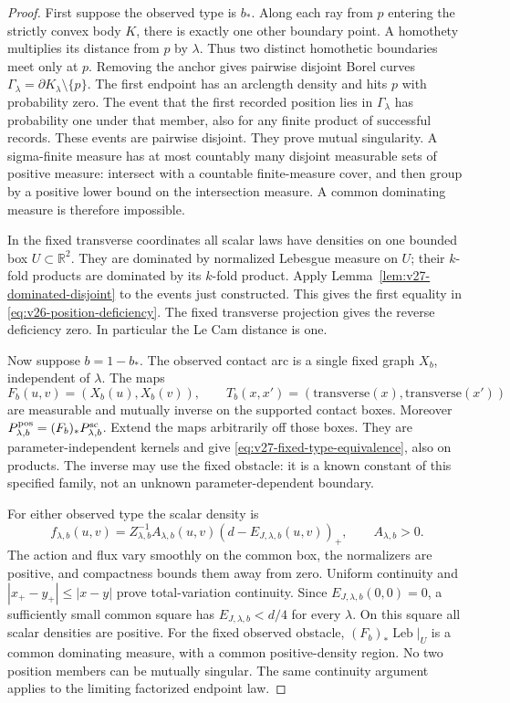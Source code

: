 \begin{proof}
First suppose the observed type is \(b_*\).  Along each ray from \(p\)
entering the strictly convex body \(K\), there is exactly one other boundary
point.  A homothety multiplies its distance from \(p\) by \(\lambda\).
Thus two distinct homothetic boundaries meet only at \(p\).  Removing the
anchor gives pairwise disjoint Borel curves
\(\Gamma_\lambda=\partial K_\lambda\setminus\{p\}\).
The first endpoint has an arclength density and hits \(p\) with probability
zero.  The event that the first recorded position lies in
\(\Gamma_\lambda\) has probability one under that member, also for any
finite product of successful records.  These events are pairwise disjoint.
They prove mutual singularity.  A sigma-finite measure has at most
countably many disjoint measurable sets of positive measure: intersect
with a countable finite-measure cover, and then group by a positive lower
bound on the intersection measure.  A common dominating measure is
therefore impossible.

In the fixed transverse coordinates all scalar laws have densities on one
bounded box \(U\subset\mathbb R^2\).  They are dominated by normalized
Lebesgue measure on \(U\); their \(k\)-fold products are dominated by its
\(k\)-fold product.  Apply Lemma~\ref{lem:v27-dominated-disjoint} to the
events just constructed.  This gives the first equality in
\eqref{eq:v26-position-deficiency}.  The fixed transverse projection gives
the reverse deficiency zero.  In particular the Le Cam distance is one.

Now suppose \(b=1-b_*\).  The observed contact arc is a single fixed graph
\(X_b\), independent of \(\lambda\).  The maps
\[
 F_b(u,v)=(X_b(u),X_b(v)),\qquad
 T_b(x,x')=(\text{transverse}(x),\text{transverse}(x'))
\]
are measurable and mutually inverse on the supported contact boxes.
Moreover \(P_{\lambda,b}^{\rm pos}=(F_b)_*P_{\lambda,b}^{\rm sc}\).
Extend the maps arbitrarily off those boxes.  They are
parameter-independent kernels and give
\eqref{eq:v27-fixed-type-equivalence}, also on products.  The inverse may
use the fixed obstacle: it is a known constant of this specified family,
not an unknown parameter-dependent boundary.

For either observed type the scalar density is
\begin{equation}\label{eq:v27-scalar-finite-density}
 f_{\lambda,b}(u,v)=Z_{\lambda,b}^{-1}A_{\lambda,b}(u,v)
                  (d-E_{J,\lambda,b}(u,v))_+,
 \qquad A_{\lambda,b}>0.
\end{equation}
The action and flux vary smoothly on the common box, the normalizers are
positive, and compactness bounds them away from zero.  Uniform continuity
and \(|x_+-y_+|\le|x-y|\) prove total-variation continuity.  Since
\(E_{J,\lambda,b}(0,0)=0\), a sufficiently small common square has
\(E_{J,\lambda,b}<d/4\) for every \(\lambda\).  On this square all
scalar densities are positive.  For the fixed observed obstacle,
\((F_b)_*\operatorname{Leb}|_U\) is a common dominating measure, with a
common positive-density region.  No two position members can be mutually
singular.  The same continuity argument applies to the limiting factorized
endpoint law.
\end{proof}

